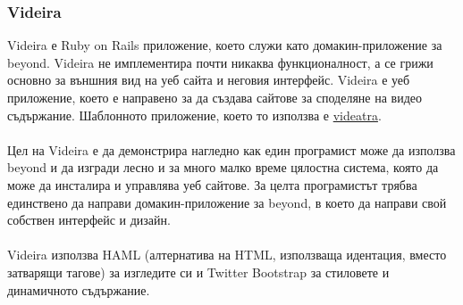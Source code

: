 \documentclass[pdftex,14pt,a4paper]{extreport}
\begin{document}
\subsubsection {Videira}
Videira е Ruby on Rails приложение, което служи като домакин-приложение за beyond. Videira не имплементира почти никаква функционалност, а се грижи основно за външния вид на уеб сайта и неговия интерфейс. Videira е уеб приложение, което е направено за да създава сайтове за споделяне на видео съдържание. Шаблонното приложение, което то използва е \href{https://github.com/d0ivanov/videatra}{videatra}.
\paragraph {}

Цел на Videira е да демонстрира нагледно как един програмист може да използва beyond и да изгради лесно и за много малко време цялостна система, която да може да инсталира и управлява уеб сайтове. За целта програмистът трябва единствено да направи домакин-приложение за beyond, в което да направи свой собствен интерфейс и дизайн.
\paragraph {}

Videira използва HAML (алтернатива на HTML, използваща идентация, вместо затварящи тагове) за изгледите си и Twitter Bootstrap за стиловете и динамичното съдържание.
\paragraph {}
\end{document}
